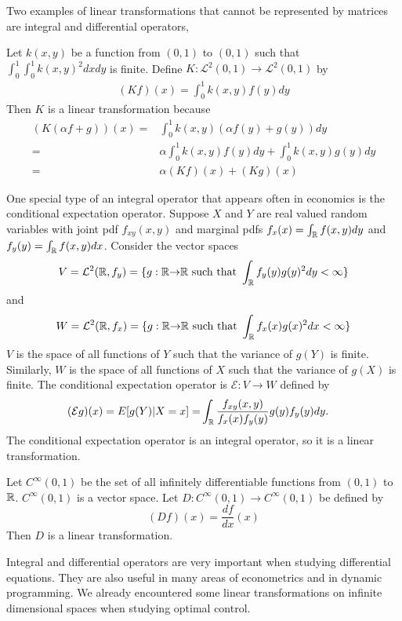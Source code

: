 Two examples of linear transformations that cannot be represented by
matrices are integral and differential operators,
\begin{example}
  Let $k(x,y)$ be a function from $(0,1)$ to $(0,1)$ such that
  $\int_0^1 \int_0^1 k(x,y)^2 dx dy$ is finite.  Define
  $K:\mathcal{L}^2(0,1) \rightarrow \mathcal{L}^2(0,1)$ by
  \begin{align*}
    (K f) (x) = \int_0^1 k(x,y) f(y) dy
  \end{align*}
  Then $K$ is a linear transformation because
  \begin{align*}
    (K ( \alpha f + g) ) (x) = & \int_0^1 k(x,y) (\alpha f(y) + g(y))dy
    \\
    = & \alpha \int_0^1 k(x,y) f(y) dy + \int_0^1 k(x,y) g(y)dy \\
    = & \alpha (K f) (x) + (K g)(x) 
  \end{align*}      
\end{example}

\begin{example}
  One special type of an integral operator that appears often in
  economics is the conditional expectation operator. Suppose $X$ and
  $Y$ are real valued random variables with joint pdf $f_{xy}(x,y)$
  and marginal pdfs $f_x(x) = \int_{\mathbb{R}} f(x,y) dy$ and $f_y(y) = \int_{\mathbb{R}}
  f(x,y) dx$. Consider the vector spaces 
  \[ 
  V = \mathcal{L}^2(\mathbb{R},f_y) = \{g:
  \mathbb{R} {\rightarrow} \mathbb{R} \text{ such that } \int_{\mathbb{R}} f_y(y) g(y)^2 dy <
  \infty \} \]
  and 
  \[ 
  W = \mathcal{L}^2(\mathbb{R},f_x) = \{g:
  \mathbb{R} {\rightarrow} \mathbb{R} \text{ such that } \int_{\mathbb{R}} f_x(x) g(x)^2 dx <
  \infty \} 
  \]  
  $V$ is the space of all functions of $Y$ such that the variance of
  $g(Y)$ is finite. Similarly, $W$ is the space of all functions of
  $X$ such that the variance of $g(X)$ is finite. 
  The conditional expectation operator is $\mathcal{E}: V \to W$
  defined by 
  \begin{align*}
    (\mathcal{E} g)(x) = E[g(Y) | X = x] = & \int_{\mathbb{R}}
    \frac{f_{xy}(x,y)}{f_x(x) f_y(y)} g(y) f_y(y) dy.
  \end{align*}
  The conditional expectation operator is an integral operator, so it
  is a linear transformation. 
\end{example}

\begin{example}
  Let $C^\infty(0,1)$ be the set of all infinitely differentiable
  functions from $(0,1)$ to $\mathbb{R}$. $C^\infty(0,1)$ is a vector space.
  Let $D:C^\infty(0,1) \rightarrow C^\infty(0,1)$ be defined by
  \[ (D f) (x) = \frac{d f}{dx}(x) \]
  Then $D$ is a linear transformation.
\end{example}
Integral and differential operators are very important when studying
differential equations.  They are also useful in many areas of
econometrics and in dynamic programming. We already encountered some linear
transformations on infinite dimensional spaces when studying optimal
control. 

